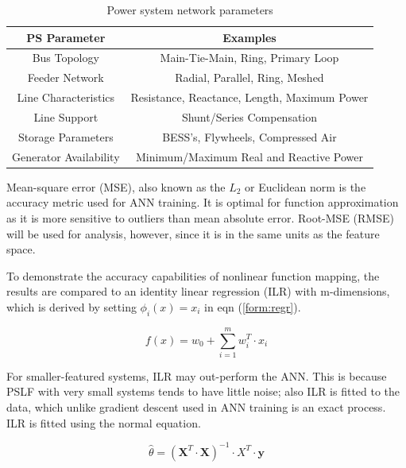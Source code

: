 \documentclass[conference]{IEEEtran}
\begin{document}
\begin{table}[h]
\centering
 \begin{tabular}{|c c|} 
  \hline
PS Parameter & Examples \\ %
 \hline\hline
Bus Topology & Main-Tie-Main, Ring, Primary Loop \\
 \hline
Feeder Network & Radial, Parallel, Ring, Meshed  \\ 
 \hline
Line Characteristics & Resistance, Reactance, Length, Maximum Power  \\
\hline
Line Support & Shunt/Series Compensation \\
\hline
Storage Parameters & BESS's, Flywheels, Compressed Air \\
\hline
Generator Availability & Minimum/Maximum Real and Reactive Power \\
\hline
\end{tabular} \vspace{1mm}
\caption[Power system network parameters]{Power system network parameters}
\label{table:sim model}
\end{table}
\vspace{-1.5em}

Mean-square error (MSE), also known as the $L_{2}$ or Euclidean norm is the accuracy metric used for ANN training. It is optimal for function approximation as it is more sensitive to outliers than mean absolute error. Root-MSE (RMSE) will be used for analysis, however, since it is in the same units as the feature space.

To demonstrate the accuracy capabilities of nonlinear function mapping, the results are compared to an identity linear regression (ILR) with m-dimensions, which is derived by setting $\phi_{i}(x) = x_{i}$ in eqn (\ref{form:regr}).

\begin{equation} f(x) = w_{0} + \sum_{i =1}^{m}w_{i}^{T} \cdot x_{i} \label{form: idnregr} \end{equation}

For smaller-featured systems, ILR may out-perform the ANN. This is because PSLF with very small systems tends to have little noise; also ILR is fitted to the data, which unlike gradient descent used in ANN training is an exact process. ILR is fitted using the normal equation.

\begin{equation} \hat{\theta} = (\textbf{X}^T \cdot \textbf{X})^{-1} \cdot{X}^T \cdot \textbf{y} \label{form:normaleqn} \end{equation}
\end{document}
